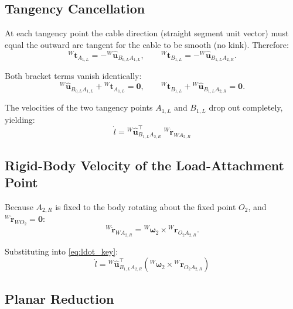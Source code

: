 \documentclass[12pt, a4paper]{article}
\theoremstyle{definition}
\begin{document}
\subsection{Tangency Cancellation}
\label{sec:tangency_cancel}

At each tangency point the cable direction (straight segment unit vector) must
equal the outward arc tangent for the cable to be smooth (no kink).  Therefore:
\begin{equation}
  {}^{W}\mathbf{t}_{A_{1,L}} = -{}^{W}\hat{\mathbf{u}}_{B_{0,L}A_{1,L}},
  \qquad
  {}^{W}\mathbf{t}_{B_{1,L}} = -{}^{W}\hat{\mathbf{u}}_{B_{1,L}A_{2,R}}.
\end{equation}

Both bracket terms vanish identically:
\begin{equation}
  {}^{W}\hat{\mathbf{u}}_{B_{0,L}A_{1,L}} + {}^{W}\mathbf{t}_{A_{1,L}} = \mathbf{0},
  \qquad
  {}^{W}\mathbf{t}_{B_{1,L}} + {}^{W}\hat{\mathbf{u}}_{B_{1,L}A_{2,R}} = \mathbf{0}.
\end{equation}

The velocities of the two tangency points $A_{1,L}$ and $B_{1,L}$ drop out completely,
yielding:
\begin{equation}
  \label{eq:ldot_key}
  \boxed{
    \dot{l}
    = {}^{W}\hat{\mathbf{u}}_{B_{1,L}A_{2,R}}^\top\;{}^{W}\dot{\mathbf{r}}_{WA_{2,R}}
  }
\end{equation}

\subsection{Rigid-Body Velocity of the Load-Attachment Point}
\label{sec:rigid_body}

Because $A_{2,R}$ is fixed to the body rotating about the fixed point $O_2$, and
${}^{W}\dot{\mathbf{r}}_{WO_2} = \mathbf{0}$:
\begin{equation}
  {}^{W}\dot{\mathbf{r}}_{WA_{2,R}}
  = {}^{W}\boldsymbol{\omega}_2 \times {}^{W}\mathbf{r}_{O_2 A_{2,R}}.
\end{equation}

Substituting into \cref{eq:ldot_key}:
\begin{equation}
  \label{eq:ldot_omega}
  \boxed{
    \dot{l}
    = {}^{W}\hat{\mathbf{u}}_{B_{1,L}A_{2,R}}^\top
      \left(
        {}^{W}\boldsymbol{\omega}_2
        \times
        {}^{W}\mathbf{r}_{O_2 A_{2,R}}
      \right)
  }
\end{equation}

\subsection{Planar Reduction}
\label{sec:planar}
\end{document}
